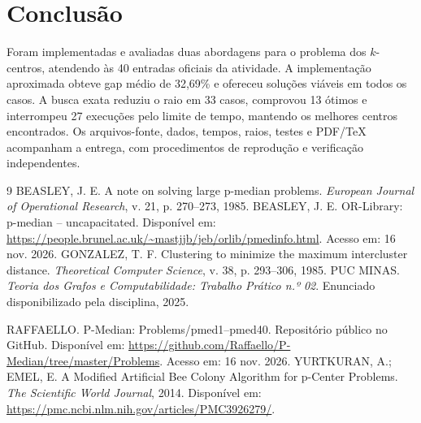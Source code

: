 \documentclass[12pt,a4paper]{article}
\begin{document}
\section{Conclusão}
Foram implementadas e avaliadas duas abordagens para o problema dos
$k$-centros, atendendo às 40 entradas oficiais da atividade.
A implementação aproximada obteve gap médio de 32,69\% e ofereceu
soluções viáveis em todos os casos. A busca exata reduziu o raio em
33 casos, comprovou 13 ótimos e interrompeu 27
execuções pelo limite de tempo, mantendo os melhores centros encontrados.
Os arquivos-fonte, dados, tempos, raios, testes e PDF/TeX acompanham a
entrega, com procedimentos de reprodução e verificação independentes.

\begin{thebibliography}{9}
BEASLEY, J. E. A note on solving large p-median problems.
\textit{European Journal of Operational Research}, v. 21, p. 270--273, 1985.
BEASLEY, J. E. OR-Library: p-median -- uncapacitated. Disponível em:
\url{https://people.brunel.ac.uk/~mastjjb/jeb/orlib/pmedinfo.html}.
Acesso em: 16 nov. 2026.
GONZALEZ, T. F. Clustering to minimize the maximum intercluster distance.
\textit{Theoretical Computer Science}, v. 38, p. 293--306, 1985.
PUC MINAS. \textit{Teoria dos Grafos e Computabilidade: Trabalho Prático n.º 02}.
Enunciado disponibilizado pela disciplina, 2025.

RAFFAELLO. P-Median: Problems/pmed1--pmed40. Repositório público no GitHub.
Disponível em: \url{https://github.com/Raffaello/P-Median/tree/master/Problems}.
Acesso em: 16 nov. 2026.
YURTKURAN, A.; EMEL, E. A Modified Artificial Bee Colony Algorithm for
p-Center Problems. \textit{The Scientific World Journal}, 2014.
Disponível em: \url{https://pmc.ncbi.nlm.nih.gov/articles/PMC3926279/}.
\end{thebibliography}
\end{document}
